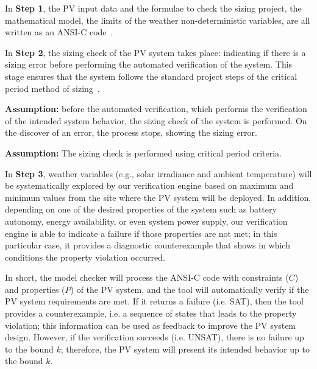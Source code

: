 In \textbf{Step 1}, the PV input data %
and the formulae to check the sizing project, the mathematical model, the limits of the weather non-deterministic variables, are all written as an ANSI-C code~\cite{ANSI2018}. 

In \textbf{Step 2}, the sizing check of the PV system takes place: indicating if there is a sizing error before performing the automated verification of the system. This stage ensures that the system follows the standard project steps of the critical period method of sizing~\cite{Pinho}. 

\textbf{Assumption:} before the automated verification, which performs the verification of the intended system behavior, the sizing check of the system is performed. On the discover of an error, the process stops, showing the sizing error.

\textbf{Assumption:} The sizing check is performed using critical period criteria.

In \textbf{Step 3}, weather variables (e.g., solar irradiance and ambient temperature) will be systematically explored by our verification engine based on maximum and minimum values from the site where the PV system will be deployed. 
In addition, depending on one of the desired properties of the system such as battery autonomy, energy availability, or even system power supply, our verification engine is able to indicate a failure if those properties are not met; in this particular case, it provides a diagnostic counterexample that shows in which conditions the property violation occurred. 

%
In short, the model checker will process the ANSI-C code with constraints ($C$) and properties ($P$) of the PV system, and the tool will automatically verify if the PV system requirements are met. If it returns a failure (i.e. SAT), then the tool provides a counterexample, i.e. a sequence of states that leads to the property violation; this information can be used as feedback to improve the PV system design. However, if the verification succeeds (i.e. UNSAT), there is no failure up to the bound $k$; therefore, the PV system will present its intended behavior up to the bound $k$.

